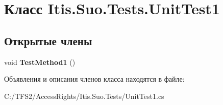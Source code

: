\hypertarget{class_itis_1_1_suo_1_1_tests_1_1_unit_test1}{}\section{Класс Itis.\+Suo.\+Tests.\+Unit\+Test1}
\label{class_itis_1_1_suo_1_1_tests_1_1_unit_test1}
\subsection*{Открытые члены}
\begin{DoxyCompactItemize}
\item 
\mbox{\label{class_itis_1_1_suo_1_1_tests_1_1_unit_test1_a62eafdb322e42646f05f755c557abbe0}} 
void {\bfseries Test\+Method1} ()
\end{DoxyCompactItemize}


Объявления и описания членов класса находятся в файле\+:\begin{DoxyCompactItemize}
\item 
C\+:/\+T\+F\+S2/\+Access\+Rights/\+Itis.\+Suo.\+Tests/Unit\+Test1.\+cs\end{DoxyCompactItemize}
